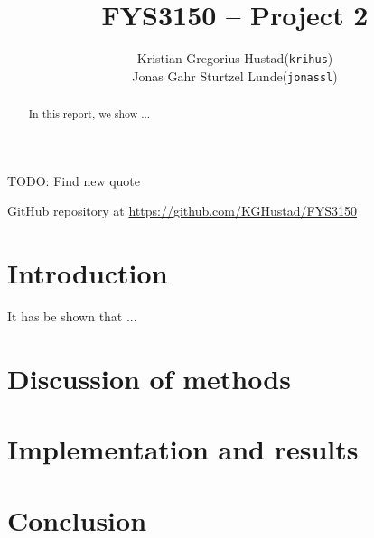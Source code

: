 \documentclass[a4paper]{article}
\begin{document}
\title{FYS3150 -- Project 2}
\author{
    \begin{tabular}{r l}
        Kristian Gregorius Hustad & (\texttt{krihus})\\
        Jonas Gahr Sturtzel Lunde & (\texttt{jonassl})
    \end{tabular}}

\maketitle



\setlength{\epigraphwidth}{0.75\textwidth}
\renewcommand{\epigraphflush}{center}
\renewcommand{\beforeepigraphskip}{50pt}
\renewcommand{\afterepigraphskip}{100pt}
\renewcommand{\epigraphsize}{\normalsize}
TODO: Find new quote

\begin{abstract}
\noindent
In this report, we show ...
\end{abstract}

\vfill


\begin{center}
    GitHub repository at \url{https://github.com/KGHustad/FYS3150}
\end{center}

\newpage

\newcommand{\half}{\frac{1}{2}}
\newcommand{\dx}{{\Delta x}}
\newcommand{\bigO}{{\mathcal{O}}}



\section{Introduction}\label{sec:intro}

It has be shown \cite{mhj_lecture_notes} that ...

\section{Discussion of methods}\label{sec:methods}


\section{Implementation and results}\label{sec:implementation_and_results}

\section{Conclusion}\label{sec:conclusion}


%
%

{}
\end{document}
